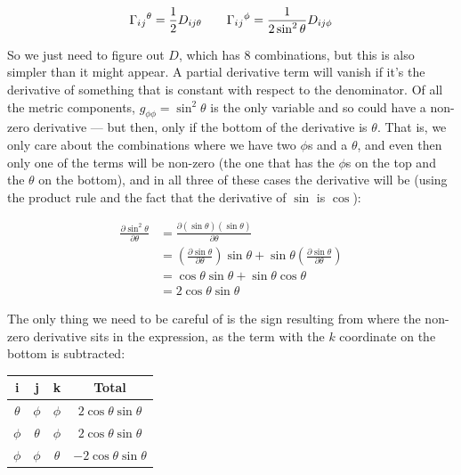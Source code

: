 $$
\Gamma\indices{_i_j^\theta} = \frac{1}{2} D_{ij\theta}
\quad \quad
\Gamma\indices{_i_j^\phi} = \frac{1}{2\sin^2 \theta} D_{ij\phi}
$$

So we just need to figure out $D$, which has 8 combinations, but this is also simpler than it might appear. A partial derivative term will vanish if it's the derivative of something that is constant with respect to the denominator. Of all the metric components, $g_{\phi\phi} = \sin^2 \theta$ is the only variable and so could have a non-zero derivative --- but then, only if the bottom of the derivative is $\theta$. That is, we only care about the combinations where we have two $\phi$s and a $\theta$, and even then only one of the terms will be non-zero (the one that has the $\phi$s on the top and the $\theta$ on the bottom), and in all three of these cases the derivative will be (using the product rule and the fact that the derivative of $\sin$ is $\cos$):

\begin{equation}
    \begin{split}
        \frac{\partial \sin^2 \theta}{\partial \theta}
        &= \frac{\partial (\sin \theta)(\sin \theta)}{\partial \theta} \\
        &= \left(\frac{\partial \sin \theta}{\partial \theta}\right) \sin \theta
        + \sin \theta \left(\frac{\partial \sin \theta}{\partial \theta}\right) \\
        &= \cos \theta \sin \theta + \sin \theta \cos \theta \\
        &= 2\cos\theta\sin\theta            
    \end{split}
\end{equation}

The only thing we need to be careful of is the sign resulting from where the non-zero derivative sits in the expression, as the term with the $k$ coordinate on the bottom is subtracted:

\begin{center}
    \begin{tabular}{ c|c|c|c }
        i & j & k & Total \\
        \hline
        $\theta$ & $\phi$ & $\phi$ & $2\cos\theta\sin\theta$ \\
        $\phi$ & $\theta$ & $\phi$ & $2\cos\theta\sin\theta$ \\
        $\phi$ & $\phi$ & $\theta$ & $-2\cos\theta\sin\theta$         
    \end{tabular}
\end{center}

